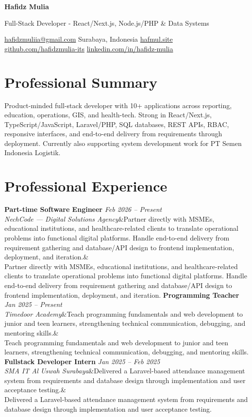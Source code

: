\documentclass[a4paper,10.5pt]{article}
\newcommand{\cvname}[1]{{\centering\LARGE\bfseries #1\par\vspace{1pt}}}
\newcommand{\cvtitle}[1]{{\centering\normalsize\color{accent} #1\par\vspace{2pt}}}
\newcommand{\cvcontact}[1]{{\centering\small #1\par\vspace{4pt}}}
\newcommand{\cventry}[4]{\noindent\textbf{#1} \hfill \textit{#3} \\\textit{#2}\ifx&#4& \else \\ {\small #4} \fi\vspace{4pt}}
\begin{document}
\cvname{Hafidz Mulia}
\cvtitle{Full-Stack Developer - React/Next.js, Node.js/PHP \& Data Systems}
\cvcontact{\href{mailto:hafidzmuliia@gmail.com}{hafidzmuliia@gmail.com} \quad\textbar\quad Surabaya, Indonesia \quad\textbar\quad \href{https://hafmul.site}{hafmul.site} \\
\href{https://github.com/hafidzmulia-its}{github.com/hafidzmulia-its} \quad\textbar\quad \href{https://www.linkedin.com/in/hafidz-mulia/}{linkedin.com/in/hafidz-mulia}}

\section{Professional Summary}
Product-minded full-stack developer with 10+ applications across reporting, education, operations, GIS, and health-tech. Strong in React/Next.js, TypeScript/JavaScript, Laravel/PHP, SQL databases, REST APIs, RBAC, responsive interfaces, and end-to-end delivery from requirements through deployment. Currently also supporting system development work for PT Semen Indonesia Logistik.

\section{Professional Experience}
\cventry{Part-time Software Engineer}{NechCode --- Digital Solutions Agency}{Feb 2026 -- Present}{Partner directly with MSMEs, educational institutions, and healthcare-related clients to translate operational problems into functional digital platforms. Handle end-to-end delivery from requirement gathering and database/API design to frontend implementation, deployment, and iteration.}
\cventry{Programming Teacher}{Timedoor Academy}{Jan 2025 -- Present}{Teach programming fundamentals and web development to junior and teen learners, strengthening technical communication, debugging, and mentoring skills.}
\cventry{Fullstack Developer Intern}{SMA IT Al Uswah Surabaya}{Jan 2025 -- Feb 2025}{Delivered a Laravel-based attendance management system from requirements and database design through implementation and user acceptance testing.}
\end{document}
